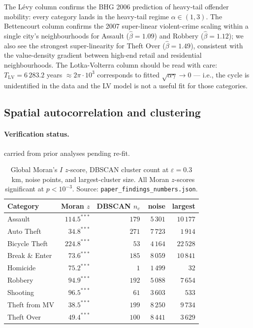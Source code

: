 \documentclass[article,shortnames,nojss]{jss}
\begin{document}
The Lévy column confirms the BHG 2006 \citep{brockmann2006bhg}
prediction of heavy-tail offender mobility: every category lands in
the heavy-tail regime $\alpha \in (1,3)$.  The Bettencourt column
confirms the 2007 \citep{bettencourt2007} super-linear violent-crime
scaling within a single city's neighbourhoods for Assault
($\hat\beta=1.09$) and Robbery ($\hat\beta=1.12$); we also see
the strongest super-linearity for Theft Over ($\hat\beta=1.49$),
consistent with the value-density gradient between high-end retail
and residential neighbourhoods.  The Lotka-Volterra column should be
read with care: $T_{\mathrm{LV}} = 6\,283.2$ years
$\approx 2\pi\cdot 10^3$ corresponds to fitted
$\sqrt{\alpha\gamma} \to 0$ --- i.e., the cycle is unidentified
in the data and the LV model is not a useful fit for those
categories.

\subsection{Spatial autocorrelation and clustering}\label{phys-spatial}


\paragraph*{Verification status.}
carried from prior analyses pending re-fit.

\begin{table}[h]
\centering\footnotesize
\caption{Global Moran's $I$ $z$-score, DBSCAN cluster count at
$\varepsilon=0.3$~km, noise points, and largest-cluster size.  All
Moran $z$-scores significant at $p<10^{-3}$.  Source:
\texttt{paper\_findings\_numbers.json}.}\label{tab:spatial}
\begin{tabular}{lrrrr}
\toprule
Category & Moran $z$ & DBSCAN $n_c$ & noise & largest\\\midrule
Assault       & $114.5^{\ast\ast\ast}$ & $179$ & $\phantom{0}5\,301$ & $10\,177$\\
Auto Theft    & $\phantom{0}34.8^{\ast\ast\ast}$ & $271$ & $\phantom{0}7\,723$ & $\phantom{0}1\,914$\\
Bicycle Theft & $224.8^{\ast\ast\ast}$ & $\phantom{0}53$ & $\phantom{0}4\,164$ & $22\,528$\\
Break \& Enter& $\phantom{0}73.6^{\ast\ast\ast}$ & $185$ & $\phantom{0}8\,059$ & $10\,841$\\
Homicide      & $\phantom{0}75.2^{\ast\ast\ast}$ & $\phantom{00}1$ & $\phantom{0}1\,499$ & $\phantom{00\,0}32$\\
Robbery       & $\phantom{0}94.9^{\ast\ast\ast}$ & $192$ & $\phantom{0}5\,088$ & $\phantom{0}7\,654$\\
Shooting      & $\phantom{0}96.5^{\ast\ast\ast}$ & $\phantom{0}61$ & $\phantom{0}3\,603$ & $\phantom{0\,0}533$\\
Theft from MV & $\phantom{0}38.5^{\ast\ast\ast}$ & $199$ & $\phantom{0}8\,250$ & $\phantom{0}9\,734$\\
Theft Over    & $\phantom{0}49.4^{\ast\ast\ast}$ & $100$ & $\phantom{0}8\,441$ & $\phantom{0}3\,629$\\
\bottomrule
\end{tabular}
\end{table}
\end{document}
